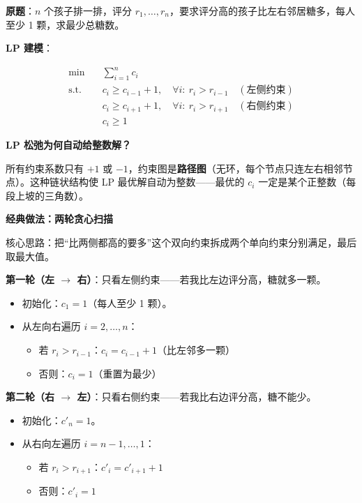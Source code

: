 \documentclass[12pt, a4paper]{ctexart}
\begin{document}
\begin{blackboard}

\textbf{原题}：$n$ 个孩子排一排，评分 $r_1, \ldots, r_n$，要求评分高的孩子比左右邻居糖多，每人至少 1 颗，求最少总糖数。

\textbf{LP 建模}：

\begin{align}
\min \quad & \sum_{i=1}^{n} c_i \\
\text{s.t.} \quad & c_i \geq c_{i-1} + 1, \quad \forall i:\ r_i > r_{i-1} \quad (\text{左侧约束}) \\
& c_i \geq c_{i+1} + 1, \quad \forall i:\ r_i > r_{i+1} \quad (\text{右侧约束}) \\
& c_i \geq 1
\end{align}

\textbf{LP 松弛为何自动给整数解？}

所有约束系数只有 $+1$ 或 $-1$，约束图是\textbf{路径图}（无环，每个节点只连左右相邻节点）。这种链状结构使 LP 最优解自动为整数——最优的 $c_i$ 一定是某个正整数（每段上坡的三角数）。

\textbf{经典做法：两轮贪心扫描}

核心思路：把``比两侧都高的要多''这个双向约束拆成两个单向约束分别满足，最后取最大值。

\textbf{第一轮（左 $\to$ 右）}：只看左侧约束——若我比左边评分高，糖就多一颗。
\begin{itemize}
    \item 初始化：$c_1 = 1$（每人至少 1 颗）。
    \item 从左向右遍历 $i = 2, \ldots, n$：
    \begin{itemize}
        \item 若 $r_i > r_{i-1}$：$c_i = c_{i-1} + 1$（比左邻多一颗）
        \item 否则：$c_i = 1$（重置为最少）
    \end{itemize}
\end{itemize}

\textbf{第二轮（右 $\to$ 左）}：只看右侧约束——若我比右边评分高，糖不能少。
\begin{itemize}
    \item 初始化：$c'_n = 1$。
    \item 从右向左遍历 $i = n-1, \ldots, 1$：
    \begin{itemize}
        \item 若 $r_i > r_{i+1}$：$c'_i = c'_{i+1} + 1$
        \item 否则：$c'_i = 1$
    \end{itemize}
\end{itemize}


\end{blackboard}
\end{document}
